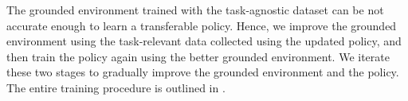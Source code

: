 The grounded environment trained with the task-agnostic dataset can be not accurate enough to learn a transferable policy. 
Hence, we improve the grounded environment using the task-relevant data collected using the updated policy, and then train the policy again using the better grounded environment. We iterate these two stages to gradually improve the grounded environment and the policy. The entire training procedure is outlined in .


